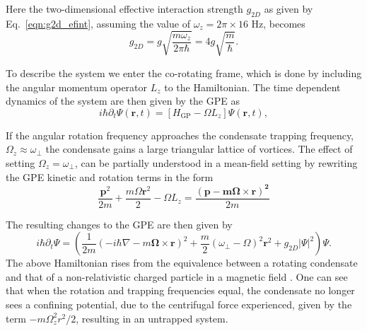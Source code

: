 Here the two-dimensional effective interaction strength $g_{2D}$ as given by Eq.~\eqref{eqn:g2d_efint}, assuming the value of $\omega_z=2\pi\times 16$ Hz, becomes
\begin{equation}
g_{2D} = g\sqrt{\frac{m\omega_z}{2\pi\hbar}} = 4g \sqrt{\frac{m}{\hbar}}.
\end{equation}

To describe the system we enter the co-rotating frame, which is done by including the angular momentum operator $L_z$ to the Hamiltonian. The time dependent dynamics of the system are then given by the GPE as
\begin{equation}\label{eqn:gpe2d_}
	i\hbar\partial_t\Psi(\mathbf{r},t) = \left[ H_{\text{GP}}  -  \Omega L_z \right] \Psi(\mathbf{r},t),
\end{equation}

If the angular rotation frequency approaches the condensate trapping frequency, $\Omega_z \approx \omega_\perp$ the condensate gains a large triangular lattice of vortices.  The effect of setting $\Omega_z=\omega_\perp$, can be partially understood in a mean-field setting by rewriting the GPE kinetic and rotation terms in the form
\begin{equation}
    \frac{\mathbf{p}^2}{2m} + \frac{m\Omega\mathbf{r}^2}{2} - \Omega L_z = \frac{\mathbf{\left(p -m\boldsymbol{\Omega}\times\mathbf{r}\right)^2}}{2m}
\end{equation}

The resulting changes to the GPE are then given by
\begin{equation}\label{eqn:vector_potential_gpe}
    i\hbar\partial_t \Psi =
    \left(\frac{1}{2m}(-i\hbar\nabla - m\boldsymbol{\Omega}\times\mathbf{r})^2 + \frac{m}{2}(\omega_\perp - \Omega)^2\mathbf{r}^2 + g_{2D}|\Psi|^2 \right)\Psi.
\end{equation}
The above Hamiltonian rises from the equivalence between a rotating condensate and that of a non-relativistic charged particle in a magnetic field \cite{Vtx:Mueller_prl_2002}.
One can see that when the rotation and trapping frequencies equal, the condensate no longer sees a confining potential, due to the centrifugal force experienced, given by the term $-m\Omega_z^2r^2/2$, resulting in an untrapped system.

